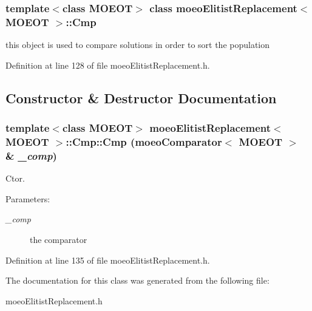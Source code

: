 \subsubsection*{template$<$class MOEOT$>$ class moeo\-Elitist\-Replacement$<$ MOEOT $>$::Cmp}

this object is used to compare solutions in order to sort the population 



Definition at line 128 of file moeo\-Elitist\-Replacement.h.

\subsection{Constructor \& Destructor Documentation}
\subsubsection{\setlength{\rightskip}{0pt plus 5cm}template$<$class MOEOT$>$ \bf{moeo\-Elitist\-Replacement}$<$ MOEOT $>$::Cmp::Cmp (\bf{moeo\-Comparator}$<$ MOEOT $>$ \& {\em \_\-comp})\hspace{0.3cm}{\tt  [inline]}}\label{classmoeoElitistReplacement_1_1Cmp_c9f21fe0df172dc601a13d6531c5ffd9}


Ctor. 

\begin{Desc}
\item[Parameters:]
\begin{description}
\item[{\em \_\-comp}]the comparator \end{description}
\end{Desc}


Definition at line 135 of file moeo\-Elitist\-Replacement.h.

The documentation for this class was generated from the following file:\begin{CompactItemize}
\item 
moeo\-Elitist\-Replacement.h\end{CompactItemize}
